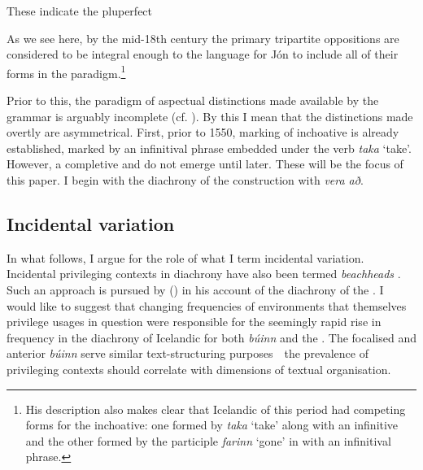 \documentclass[output=paper,colorlinks,citecolor=brown]{langscibook}
\begin{document}
\ea These indicate the pluperfect
  \z 
\z 

As we see here, by the mid-18th century the primary tripartite oppositions are considered to be integral enough to the language for Jón to include all of their forms in the paradigm.\footnote{His description also makes clear that Icelandic of this period had competing forms for the inchoative: one formed by \textit{taka} `take' along with an infinitive and the other formed by the participle \textit{farinn} `gone' in  with an infinitival phrase.}

Prior to this, the paradigm of aspectual distinctions made available by the grammar is arguably incomplete (cf. \citeauthor{arnason1977buinn}  \citeyear{arnason1977buinn}). By this I mean that the distinctions made overtly are asymmetrical. First, prior to 1550, marking of inchoative  is already established, marked by an infinitival phrase embedded under the verb \textit{taka} `take'. However, a completive  and    do not emerge until later. These will be the focus of this paper. I begin with the diachrony of the   construction with \textit{vera að}. 


\subsection{Incidental variation}\label{sec:Chark2.1}

In what follows, I argue for the role of what I term incidental variation. Incidental privileging contexts in diachrony have also been termed \textit{beachheads} \citep{givon1979understanding, aldai2002grammaticalization}.  Such an approach is pursued by \citeauthor{petre2016grammaticalization} (\citeyear{petre2016grammaticalization}) in his account of the diachrony of the  .  I would like to suggest that changing frequencies of environments that themselves privilege usages in question were responsible for the seemingly rapid rise in frequency in the diachrony of Icelandic for both \textit{búinn} and the . The focalised   and anterior \textit{búinn} serve similar text-structuring purposes\ \textendash{}\  the prevalence of privileging contexts should correlate with dimensions of textual organisation.
\end{document}
